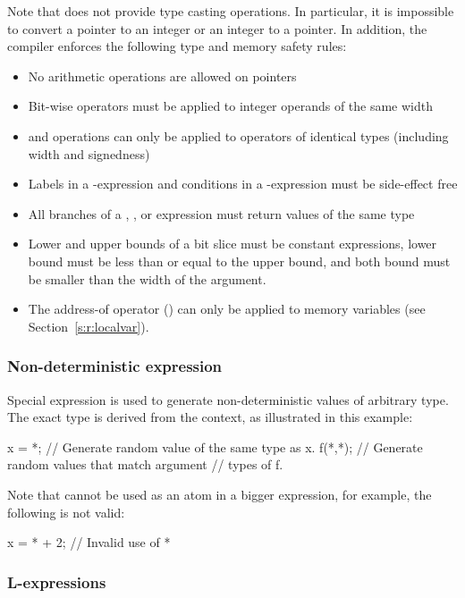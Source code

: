 Note that \tsl does not provide type casting operations.  In 
particular, it is impossible to convert a pointer to an integer or 
an integer to a pointer.  In addition, the \tsl compiler enforces the 
following type and memory safety rules:
\begin{itemize}
    \item No arithmetic operations are allowed on pointers
    \item Bit-wise operators must be applied to integer operands 
        of the same width
    \item \src{==} and \src{!=} operations can only be applied to 
        operators of identical types (including width and 
        signedness)
    \item Labels in a -expression and conditions in a 
        -expression must be side-effect free
    \item All branches of a , , or 
        expression must return values of the same type
    \item Lower and upper bounds of a bit slice must be constant 
        expressions, lower bound must be less than or equal to the 
        upper bound, and both bound must be smaller than the width
        of the argument.
    \item The address-of operator (\src{\&}) can only be applied 
        to memory variables (see Section~\ref{s:r:localvar}).
\end{itemize}

\subsubsection{Non-deterministic expression}

Special expression \src{*} is used to generate non-deterministic 
values of arbitrary type.  The exact type is derived from the 
context, as illustrated in this example:
\begin{tsllisting2}
x = *;  // Generate random value of the same type as x.
f(*,*); // Generate random values that match argument 
        // types of f.
\end{tsllisting2}
Note that \src{*} cannot be used as an atom in a bigger expression,
for example, the following is not valid:
\begin{tsllisting2}
x = * + 2; // Invalid use of *
\end{tsllisting2}

\subsubsection{L-expressions}\label{s:r:lexpr}

